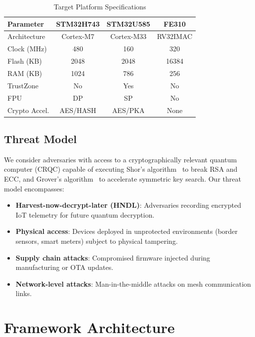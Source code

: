 \documentclass[conference,10pt]{IEEEtran}
\begin{document}
\begin{table}[t]
\centering
\caption{Target Platform Specifications}
\label{tab:platforms}
\begin{tabular}{lccc}
\toprule
\textbf{Parameter} & \textbf{STM32H743} & \textbf{STM32U585} & \textbf{FE310} \\
\midrule
Architecture & Cortex-M7 & Cortex-M33 & RV32IMAC \\
Clock (MHz) & 480 & 160 & 320 \\
Flash (KB) & 2048 & 2048 & 16384 \\
RAM (KB) & 1024 & 786 & 256 \\
TrustZone & No & Yes & No \\
FPU & DP & SP & No \\
Crypto Accel. & AES/HASH & AES/PKA & None \\
\bottomrule
\end{tabular}
\end{table}

\subsection{Threat Model}

We consider adversaries with access to a cryptographically relevant quantum computer (CRQC) capable of executing Shor's algorithm~\cite{shor1997} to break RSA and ECC, and Grover's algorithm~\cite{grover1996} to accelerate symmetric key search. Our threat model encompasses:

\begin{itemize}[leftmargin=*]
  \item \textbf{Harvest-now-decrypt-later (HNDL)}: Adversaries recording encrypted IoT telemetry for future quantum decryption.
  \item \textbf{Physical access}: Devices deployed in unprotected environments (border sensors, smart meters) subject to physical tampering.
  \item \textbf{Supply chain attacks}: Compromised firmware injected during manufacturing or OTA updates.
  \item \textbf{Network-level attacks}: Man-in-the-middle attacks on mesh communication links.
\end{itemize}

\section{Framework Architecture}
\label{sec:architecture}
\end{document}
